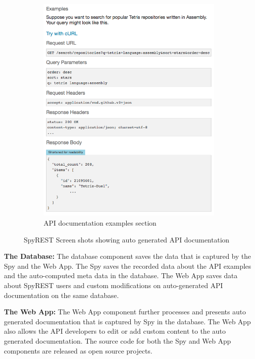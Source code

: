 \begin{figure}[!tbh]
\begin{subfigure}[t]{0.5\textwidth}
    \includegraphics[width=\linewidth]{spyrest_examples.png}
    \caption{API documentation examples section}
    \label{fig:examples}
  \end{subfigure}
  \caption{SpyREST Screen shots showing auto generated API documentation}
  \label{fig:spyrest_screenshots}
\end{figure}

\textbf{The Database:} The database component saves the data that is captured by the Spy and the Web App. The Spy saves the recorded data about the API examples and the auto-computed meta data in the database. The Web App saves data about SpyREST users and custom modifications on auto-generated API documentation on the same database.

\textbf{The Web App:} The Web App component further processes and presents auto generated documentation that is captured by Spy in the database. The Web App also allows the API developers to edit or add custom content to the auto generated documentation. The source code for both the Spy and Web App components are released as open source projects.

